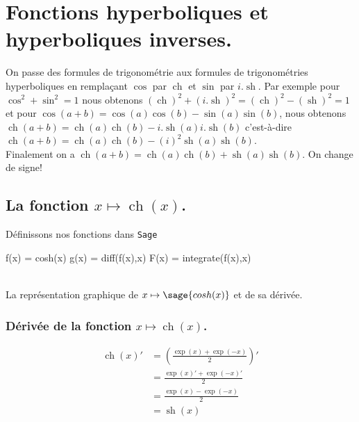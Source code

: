 \documentclass[a4paper,landscape,17pt]{extreport} %
\renewcommand{\sinh}{\mathop{\mathrm{sh}}}
\renewcommand{\cosh}{\mathop{\mathrm{ch}}}
\begin{document}

\chapter{Fonctions hyperboliques et hyperboliques inverses.}


On passe des formules de trigonométrie aux formules de trigonométries hyperboliques en remplaçant $\cos$ par $\cosh$ et $\sin$ par $i . \sinh$. Par exemple pour $\cos^2+\sin^2=1$
nous obtenons $(\cosh)^2 + (i . \sinh)^2= (\cosh)^2 - (\sinh)^2 = 1$ et pour $\cos(a+b)=\cos(a) \cos(b) - \sin(a) \sin(b) $, nous obtenons $\cosh(a+b)=\cosh(a) \cosh(b) - i .\sinh(a) i . \sinh(b) $ c'est-à-dire $\cosh(a+b)=\cosh(a) \cosh(b) - (i)^2 \sinh(a) \sinh(b) $. \\ Finalement on a $\cosh(a+b) = \cosh(a) \cosh(b) + \sinh(a) \sinh(b) $. On change de signe!


\section{La fonction  $x \mapsto \cosh(x)$.}

Définissons nos fonctions dans {\texttt{Sage}}
\begin{sageblock}
    f(x) = cosh(x)
    g(x) = diff(f(x),x)
    F(x) = integrate(f(x),x)
\end{sageblock}



\begin{center}
 \\
La représentation graphique de $x \mapsto \sage{cosh(x)} $ et de sa dérivée. 
\end{center}

\subsection{Dérivée de la fonction $x \mapsto \cosh(x)$.}
\begin{align*}
\cosh(x)' & = \left( \frac{\exp(x)+\exp(-x)}{2} \right)' \\ 
& = \frac{\exp(x)'+\exp(-x)'}{2} \\
& = \frac{\exp(x)-\exp(-x)}{2} \\
& = \sinh(x)
\end{align*}
\end{document}

